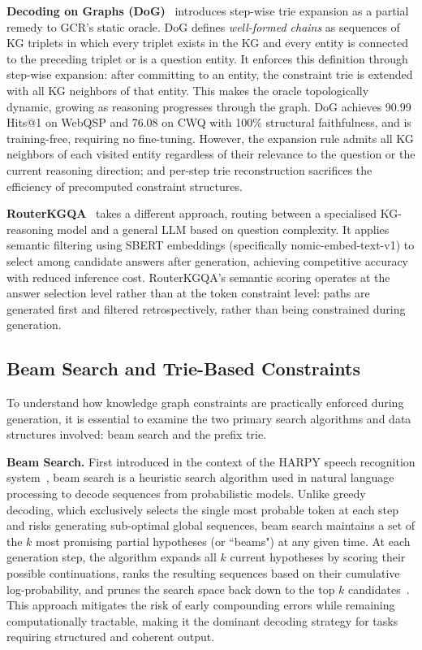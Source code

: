 \textbf{Decoding on Graphs (DoG)}~\citep{li2024dog} introduces step-wise trie expansion as a partial remedy to GCR's static oracle. DoG defines \textit{well-formed chains} as sequences of KG triplets in which every triplet exists in the KG and every entity is connected to the preceding triplet or is a question entity. It enforces this definition through step-wise expansion: after committing to an entity, the constraint trie is extended with all KG neighbors of that entity. This makes the oracle topologically dynamic, growing as reasoning progresses through the graph. DoG achieves 90.99 Hits@1 on WebQSP and 76.08 on CWQ with 100\% structural faithfulness, and is training-free, requiring no fine-tuning. However, the expansion rule admits all KG neighbors of each visited entity regardless of their relevance to the question or the current reasoning direction; and per-step trie reconstruction sacrifices the efficiency of precomputed constraint structures.

\textbf{RouterKGQA}~\citep{yuan2026routerkgqa} takes a different approach, routing between a specialised KG-reasoning model and a general LLM based on question complexity. It applies semantic filtering using SBERT embeddings (specifically nomic-embed-text-v1) to select among candidate answers after generation, achieving competitive accuracy with reduced inference cost. RouterKGQA's semantic scoring operates at the answer selection level rather than at the token constraint level: paths are generated first and filtered retrospectively, rather than being constrained during generation.

\subsection{Beam Search and Trie-Based Constraints}

To understand how knowledge graph constraints are practically enforced during generation, it is essential to examine the two primary search algorithms and data structures involved: beam search and the prefix trie.

\textbf{Beam Search.} First introduced in the context of the HARPY speech recognition system~\citep{lowerre1976harpy}, beam search is a heuristic search algorithm used in natural language processing to decode sequences from probabilistic models. Unlike greedy decoding, which exclusively selects the single most probable token at each step and risks generating sub-optimal global sequences, beam search maintains a set of the $k$ most promising partial hypotheses (or ``beams") at any given time. At each generation step, the algorithm expands all $k$ current hypotheses by scoring their possible continuations, ranks the resulting sequences based on their cumulative log-probability, and prunes the search space back down to the top $k$ candidates~\citep{holtzman2020curious}. This approach mitigates the risk of early compounding errors while remaining computationally tractable, making it the dominant decoding strategy for tasks requiring structured and coherent output.

